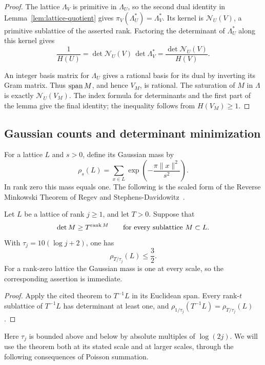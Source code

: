 \begin{proof}
The lattice \(\Lambda_V\) is primitive in \(\Lambda_U\), so the
second dual identity in Lemma~\ref{lem:lattice-quotient} gives
\(\pi_V(\Lambda_U^*)=\Lambda_V^*\). Its kernel is
\(\mathcal N_U(V)\), a primitive sublattice of the asserted rank.
Factoring the determinant of \(\Lambda_U^*\) along this kernel gives
\[
 \frac1{H(U)}
 =\det\mathcal N_U(V)\,\det\Lambda_V^*
 =\frac{\det\mathcal N_U(V)}{H(V)}.
\]

An integer basis matrix for \(\Lambda_U\) gives a rational basis for
its dual by inverting its Gram matrix. Thus \(\operatorname{span} M\), and hence
\(V_M\), is rational. The saturation of \(M\) in \(\Lambda\) is
exactly \(\mathcal N_U(V_M)\). The index formula for determinants
and the first part of the lemma give the final identity; the
inequality follows from \(H(V_M)\ge1\).
\end{proof}

\subsection{Gaussian counts and determinant minimization}

For a lattice \(L\) and \(s>0\), define its Gaussian mass by
\[
 \rho_s(L)=\sum_{x\in L}\exp\!\left(-\frac{\pi\|x\|^2}{s^2}\right).
\]
In rank zero this mass equals one. The following is the scaled form
of the Reverse Minkowski Theorem of Regev and
Stephens-Davidowitz~\cite[Theorem~1.2]{ReverseMinkowski}.

\begin{theorem}\label{thm:reverse-minkowski}
Let \(L\) be a lattice of rank \(j\ge1\), and let \(T>0\). Suppose
that
\[
 \det M\ge T^{\operatorname{rank} M}\qquad\text{for every sublattice }M\subset L.
\]
With \(\tau_j=10(\log j+2)\), one has
\[
 \rho_{T/\tau_j}(L)\le\frac32.
\]
For a rank-zero lattice the Gaussian mass is one at every scale, so
the corresponding assertion is immediate.
\end{theorem}

\begin{proof}
Apply the cited theorem to \(T^{-1}L\) in its Euclidean span.
Every rank-\(t\) sublattice of \(T^{-1}L\) has determinant at least
one, and \(\rho_{1/\tau_j}(T^{-1}L)=\rho_{T/\tau_j}(L)\).
\end{proof}

Here \(\tau_j\) is bounded above and below by absolute multiples of
\(\log(2j)\). We will use the theorem both at its stated scale and
at larger scales, through the following consequences of Poisson
summation.

